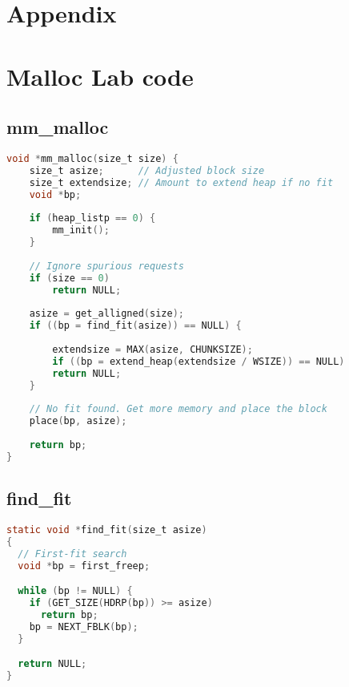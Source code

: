 \documentclass[11pt]{report}
\begin{document}
\chapter{Appendix}
\appendix
\chapter{Malloc Lab code}
\section{mm\_malloc}\label{appendix:malloc_lab_code_mm_malloc}
\begin{lstlisting}[language=C]
void *mm_malloc(size_t size) {
    size_t asize;      // Adjusted block size 
    size_t extendsize; // Amount to extend heap if no fit 
    void *bp;
    
    if (heap_listp == 0) {
        mm_init();
    }
    
    // Ignore spurious requests 
    if (size == 0)
        return NULL;
    
    asize = get_alligned(size);
    if ((bp = find_fit(asize)) == NULL) {
    
        extendsize = MAX(asize, CHUNKSIZE);
        if ((bp = extend_heap(extendsize / WSIZE)) == NULL)
        return NULL;
    }
    
    // No fit found. Get more memory and place the block 
    place(bp, asize);
    
    return bp;
}
\end{lstlisting}

\section{find\_fit}\label{appendix:malloc_lab_code_find_fit}
\begin{lstlisting}[language=C]
static void *find_fit(size_t asize)
{
  // First-fit search 
  void *bp = first_freep;

  while (bp != NULL) {
    if (GET_SIZE(HDRP(bp)) >= asize)
      return bp;
    bp = NEXT_FBLK(bp);
  }

  return NULL;
}
\end{lstlisting}
\end{document}

